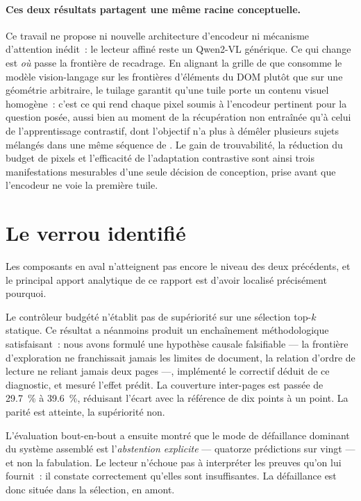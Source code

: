 \paragraph{Ces deux résultats partagent une même racine conceptuelle.} Ce
travail ne propose ni nouvelle architecture d'encodeur ni mécanisme
d'attention inédit~: le lecteur affiné reste un Qwen2-VL générique. Ce qui
change est \emph{où} passe la frontière de recadrage. En alignant la grille de
 que consomme le modèle vision-langage sur les frontières
d'éléments du DOM plutôt que sur une géométrie arbitraire, le tuilage garantit
qu'une tuile porte un contenu visuel homogène~: c'est ce qui rend chaque pixel
soumis à l'encodeur pertinent pour la question posée, aussi bien au moment de
la récupération non entraînée qu'à celui de l'apprentissage contrastif, dont
l'objectif n'a plus à démêler plusieurs sujets mélangés dans une même séquence
de . Le gain de trouvabilité, la réduction du budget de
pixels et l'efficacité de l'adaptation contrastive sont ainsi trois
manifestations mesurables d'une seule décision de conception, prise avant que
l'encodeur ne voie la première tuile.

\section*{Le verrou identifié}

Les composants en aval n'atteignent pas encore le niveau des deux précédents, et
le principal apport analytique de ce rapport est d'avoir localisé précisément
pourquoi.

Le contrôleur budgété n'établit pas de supériorité sur une sélection top-$k$
statique. Ce résultat a néanmoins produit un enchaînement méthodologique
satisfaisant~: nous avons formulé une hypothèse causale falsifiable --- la
frontière d'exploration ne franchissait jamais les limites de document, la
relation d'ordre de lecture ne reliant jamais deux pages ---, implémenté le
correctif déduit de ce diagnostic, et mesuré l'effet prédit. La couverture
inter-pages est passée de \SI{29.7}{\percent} à \SI{39.6}{\percent}, réduisant
l'écart avec la référence de dix points à un point. La parité est atteinte, la
supériorité non.

L'évaluation bout-en-bout a ensuite montré que le mode de défaillance dominant du
système assemblé est l'\emph{abstention explicite} --- quatorze prédictions sur
vingt --- et non la fabulation. Le lecteur n'échoue pas à interpréter les preuves
qu'on lui fournit~: il constate correctement qu'elles sont insuffisantes. La
défaillance est donc située dans la sélection, en amont.

